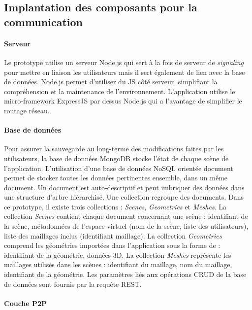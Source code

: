 \subsection{Implantation des composants pour la 
	communication}
		\paragraph{Serveur}
		
Le prototype utilise un serveur Node.js qui sert à la fois de serveur de 
\textit{signaling} pour mettre en liaison les utilisateurs mais il sert également 
de lien avec la base de données. Node.js permet d'utiliser du \gls{JS} côté 
serveur, simplifiant la compréhension et la maintenance de l'environnement. 
L'application utilise le micro-framework ExpressJS par dessus Node.js qui a 
l'avantage de simplifier le routage réseau.

		\paragraph{Base de données}

Pour assurer la sauvegarde au long-terme des modifications faites par les 
utilisateurs, la base de données MongoDB stocke l'état de chaque scène de 
l'application. L'utilisation d'une base de données NoSQL orientée document 
permet de stocker toutes les données pertinentes ensemble, dans un même 
document. Un document est auto-descriptif et peut imbriquer des données 
dans une structure d'arbre hiérarchisé. Une collection regroupe des 
documents. Dans ce prototype, il existe trois collections : \textit{Scenes},
\textit{Geometries} et \textit{Meshes}. 
La collection \textit{Scenes} contient chaque document concernant une 
scène : identifiant de la scène, métadonnées de l'espace virtuel (nom de la 
scène, liste des utilisateurs), liste des maillages inclus (identifiant maillage). 
La collection \textit{Geometries} comprend les géométries importées dans 
l'application sous la forme de : identifiant de la géométrie, données 3D.
La collection \textit{Meshes} représente les maillages utilisés dans les 
scènes : identifiant du maillage, nom du maillage, identifiant de la géométrie.
Les paramètres liés aux opérations \gls{CRUD} de la base de données sont 
fournis par la requête \gls{REST}. 

		\paragraph{Couche \gls{P2P}} 

